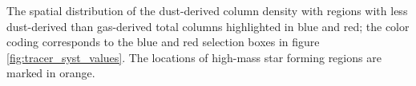 \label{fig:tracer_syst_spatial}

The spatial distribution of the dust-derived column density with regions with less dust-derived than gas-derived total columns highlighted in blue and red; the color coding corresponds to the blue and red selection boxes in figure \ref{fig:tracer_syst_values}. The locations of high-mass star forming regions are marked in orange. 
